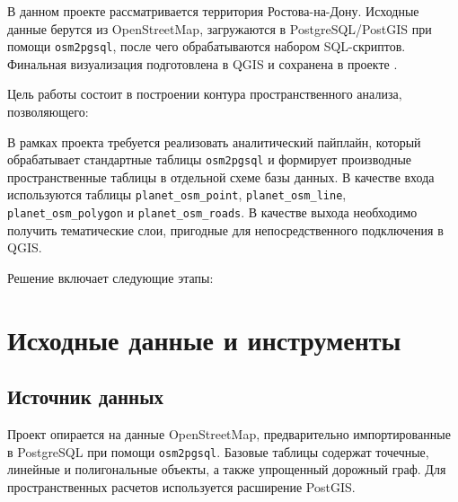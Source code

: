 \documentclass[a4paper,article,14pt]{extarticle}
\begin{document}


\tableofcontents
\pagebreak


В данном проекте рассматривается территория Ростова-на-Дону. Исходные данные
берутся из OpenStreetMap, загружаются в PostgreSQL/PostGIS при помощи
\texttt{osm2pgsql}, после чего обрабатываются набором SQL-скриптов. Финальная
визуализация подготовлена в QGIS и сохранена в проекте .

Цель работы состоит в построении контура пространственного
анализа, позволяющего:

В рамках проекта требуется реализовать аналитический пайплайн, который
обрабатывает стандартные таблицы \texttt{osm2pgsql} и формирует производные
пространственные таблицы в отдельной схеме базы данных. В качестве входа
используются таблицы \texttt{planet\_osm\_point}, \texttt{planet\_osm\_line},
\texttt{planet\_osm\_polygon} и \texttt{planet\_osm\_roads}. В качестве выхода
необходимо получить тематические слои, пригодные для непосредственного
подключения в QGIS.

Решение включает следующие этапы:

\section{Исходные данные и инструменты}

\subsection{Источник данных}

Проект опирается на данные OpenStreetMap, предварительно импортированные в
PostgreSQL при помощи \texttt{osm2pgsql}. Базовые таблицы содержат точечные,
линейные и полигональные объекты, а также упрощенный дорожный граф. Для
пространственных расчетов используется расширение PostGIS.
\end{document}
